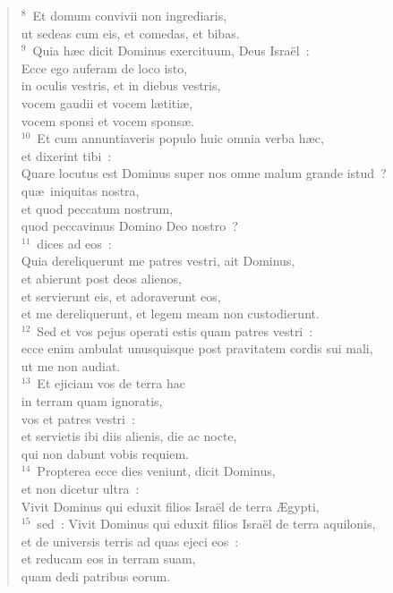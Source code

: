 \begin{verse}
${}^{8}$~Et domum convivii non ingrediaris,\\ ut sedeas cum eis, et comedas, et bibas.\\
${}^{9}$~Quia h\ae c dicit Dominus exercituum, Deus Isra\"el~:\\ Ecce ego auferam de loco isto,\\ in oculis vestris, et in diebus vestris,\\ vocem gaudii et vocem l\ae titi\ae ,\\ vocem sponsi et vocem spons\ae .\\
${}^{10}$~Et cum annuntiaveris populo huic omnia verba h\ae c,\\ et dixerint tibi~:\\ Quare locutus est Dominus super nos omne malum grande istud~?\\ qu\ae\ iniquitas nostra,\\ et quod peccatum nostrum,\\ quod peccavimus Domino Deo nostro~?\\
${}^{11}$~dices ad eos~:\\ Quia dereliquerunt me patres vestri, ait Dominus,\\ et abierunt post deos alienos,\\ et servierunt eis, et adoraverunt eos,\\ et me dereliquerunt, et legem meam non custodierunt.\\
${}^{12}$~Sed et vos pejus operati estis quam patres vestri~:\\ ecce enim ambulat unusquisque post pravitatem cordis sui mali,\\ ut me non audiat.\\
${}^{13}$~Et ejiciam vos de terra hac\\ in terram quam ignoratis,\\ vos et patres vestri~:\\ et servietis ibi diis alienis, die ac nocte,\\ qui non dabunt vobis requiem.\\
${}^{14}$~Propterea ecce dies veniunt, dicit Dominus,\\ et non dicetur ultra~:\\ Vivit Dominus qui eduxit filios Isra\"el de terra \AE gypti,\\
${}^{15}$~sed~: Vivit Dominus qui eduxit filios Isra\"el de terra aquilonis,\\ et de universis terris ad quas ejeci eos~:\\ et reducam eos in terram suam,\\ quam dedi patribus eorum.\\

\end{verse}
